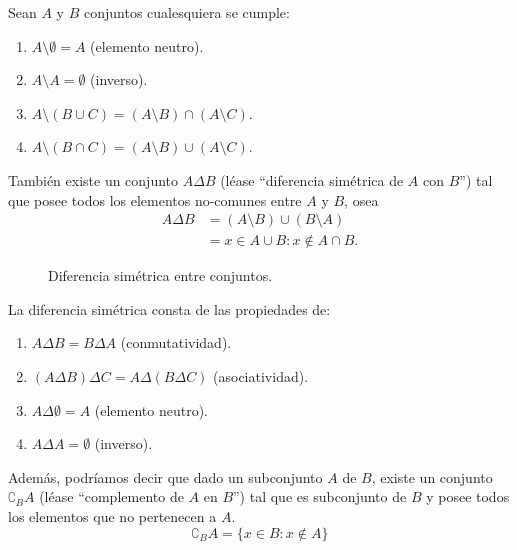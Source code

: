 \documentclass[11pt,oneside,a4paper]{book}
\begin{document}
\begin{prop}
Sean $A$ y $B$ conjuntos cualesquiera se cumple:
\begin{enumerate}
\item $A\setminus\emptyset=A$ (elemento neutro).
\item $A\setminus A=\emptyset$ (inverso).
\item $A\setminus(B\cup C)=(A\setminus B)\cap(A\setminus C)$.
\item $A\setminus(B\cap C)=(A\setminus B)\cup(A\setminus C)$.
\end{enumerate}
\end{prop}

También existe un conjunto $A\Delta B$ (léase ``diferencia simétrica de $A$ con $B$'') tal que posee todos los elementos no-comunes entre $A$ y $B$, osea
$$
\begin{aligned}
A\Delta B&=(A\setminus B)\cup(B\setminus A)\\
&={x\in A\cup B:x\notin A\cap B}.
\end{aligned}
$$
\begin{figure}
\centering
{}
\caption{Diferencia simétrica entre conjuntos.}
\end{figure}

\begin{prop}
La diferencia simétrica consta de las propiedades de:
\begin{enumerate}
\item $A\Delta B=B\Delta A$ (conmutatividad).
\item $(A\Delta B)\Delta C=A\Delta(B\Delta C)$ (asociatividad).
\item $A\Delta\emptyset=A$ (elemento neutro).
\item $A\Delta A=\emptyset$ (inverso).
\end{enumerate}
\end{prop}

Además, podríamos decir que dado un subconjunto $A$ de $B$, existe un conjunto $\complement_B A$ (léase ``complemento de $A$ en $B$'') tal que es subconjunto de $B$ y posee todos los elementos que no pertenecen a $A$.
$$
\complement_B A=\{x\in B:x\notin A\}
$$
\end{document}
